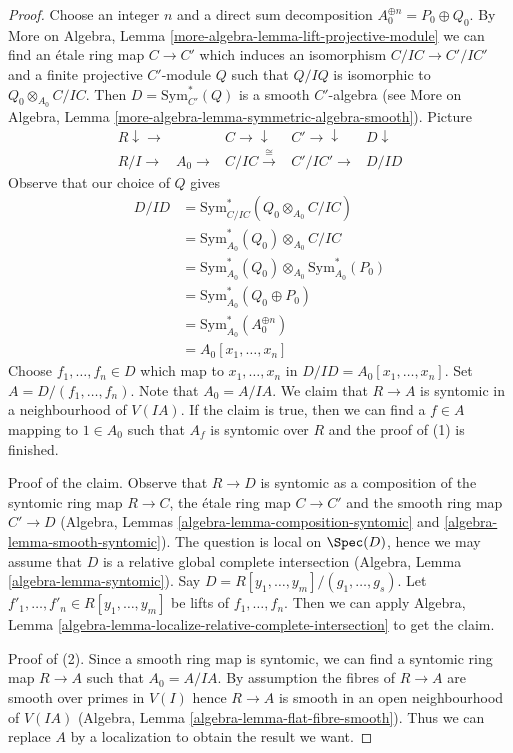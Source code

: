 \begin{proof}
\medskip\noindent
Choose an integer $n$ and a direct sum decomposition
$A_0^{\oplus n} = P_0 \oplus Q_0$.
By More on Algebra, Lemma \ref{more-algebra-lemma-lift-projective-module}
we can find an \'etale ring map $C \to C'$ which induces
an isomorphism $C/IC \to C'/IC'$ and a finite projective
$C'$-module $Q$ such that $Q/IQ$ is isomorphic to
$Q_0 \otimes_{A_0} C/IC$.
Then $D = \text{Sym}_{C'}^*(Q)$ is a smooth $C'$-algebra (see
More on Algebra, Lemma \ref{more-algebra-lemma-symmetric-algebra-smooth}).
Picture
$$
\begin{array}{ccccc}R \downarrow\longrightarrow &  & C \longrightarrow\downarrow & C' \longrightarrow\downarrow & D \downarrow \\ R/I \longrightarrow & A_0 \longrightarrow & C/IC \overset{\cong}{\longrightarrow} & C'/IC' \longrightarrow & D/ID\end{array}
$$
Observe that our choice of $Q$ gives
\begin{align*}
D/ID & =
\text{Sym}_{C/IC}^*(Q_0 \otimes_{A_0} C/IC) \\
& =
\text{Sym}_{A_0}^*(Q_0) \otimes_{A_0} C/IC \\
& =
\text{Sym}_{A_0}^*(Q_0) \otimes_{A_0}
\text{Sym}_{A_0}^*(P_0) \\
& =
\text{Sym}_{A_0}^*(Q_0 \oplus P_0) \\
& =
\text{Sym}_{A_0}^*(A_0^{\oplus n}) \\
& =
A_0[x_1, \ldots, x_n]
\end{align*}
Choose $f_1, \ldots, f_n \in D$ which map to $x_1, \ldots, x_n$
in $D/ID = A_0[x_1, \ldots, x_n]$. Set $A = D/(f_1, \ldots, f_n)$.
Note that $A_0 = A/IA$. We claim that $R \to A$ is syntomic
in a neighbourhood of $V(IA)$. If the claim is true, then we can
find a $f \in A$ mapping to $1 \in A_0$ such that $A_f$ is syntomic
over $R$ and the proof of (1) is finished.

\medskip\noindent
Proof of the claim. Observe that $R \to D$ is syntomic as a composition
of the syntomic ring map $R \to C$, the \'etale ring map $C \to C'$ and the
smooth ring map $C' \to D$ (Algebra, Lemmas
\ref{algebra-lemma-composition-syntomic} and
\ref{algebra-lemma-smooth-syntomic}).
The question is local on $\Spec(D)$, hence we
may assume that $D$ is a relative global complete intersection
(Algebra, Lemma \ref{algebra-lemma-syntomic}).
Say $D = R[y_1, \ldots, y_m]/(g_1, \ldots, g_s)$.
Let $f'_1, \ldots, f'_n \in R[y_1, \ldots, y_m]$ be lifts of
$f_1, \ldots, f_n$. Then we can apply
Algebra, Lemma \ref{algebra-lemma-localize-relative-complete-intersection}
to get the claim.

\medskip\noindent
Proof of (2). Since a smooth ring map is syntomic, we can find
a syntomic ring map $R \to A$ such that $A_0 = A/IA$.
By assumption the fibres of $R \to A$ are smooth over primes in $V(I)$
hence $R \to A$ is smooth in an open neighbourhood of $V(IA)$
(Algebra, Lemma \ref{algebra-lemma-flat-fibre-smooth}).
Thus we can replace $A$ by a localization to obtain the result we want.
\end{proof}

